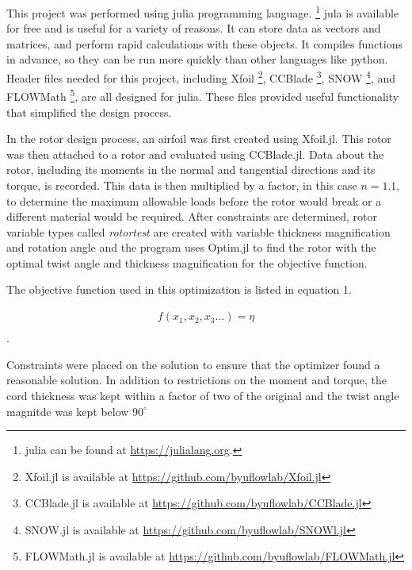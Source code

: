 \documentclass[journal ]{new-aiaa}
\begin{document}
This project was performed using julia programming language. \footnote{julia can be found at \url{https://julialang.org}.} jula is available for free and is useful for a variety of reasons. It can store data as vectors and matrices, and perform rapid calculations with these objects. It compiles functions in advance, so they can be run more quickly than other languages like python. Header files needed for this project, including Xfoil \footnote{Xfoil.jl is available at \url{https://github.com/byuflowlab/Xfoil.jl}}, CCBlade \footnote{CCBlade.jl is available at \url{https://github.com/byuflowlab/CCBlade.jl}}, SNOW \footnote{SNOW.jl is available at \url{https://github.com/byuflowlab/SNOWl.jl}}, and FLOWMath \footnote{FLOWMath.jl is available at \url{https://github.com/byuflowlab/FLOWMath.jl}}, are all designed for julia. These files provided useful functionality that simplified the design process.

In the rotor design process, an airfoil was first created using Xfoil.jl. This rotor was then attached to a rotor and evaluated using CCBlade.jl. Data about the rotor, including its moments in the normal and tangential directions and its torque, is recorded. This data is then multiplied by a factor, in this case $n=1.1$, to determine the maximum allowable loads before the rotor would break or a different material would be required. After constraints are determined, rotor variable types called \emph{rotortest} are created with variable thickness magnification and rotation angle and the program uses Optim.jl to find the rotor with the optimal twist angle and thickness magnification for the objective function.

The objective function used in this optimization is listed in equation 1. 

\begin{equation}
	\begin{aligned}
	\label{equation:1}
	f(x_{1}, x_{2}, x_{3}...) = \eta \\
	\end{aligned}
\end{equation}.

Constraints were placed on the solution to ensure that the optimizer found a reasonable solution. In addition to restrictions on the moment and torque, the cord thickness was kept within a factor of two of the original and the twist angle magnitde was kept below $90^{\circ}$
\end{document}
